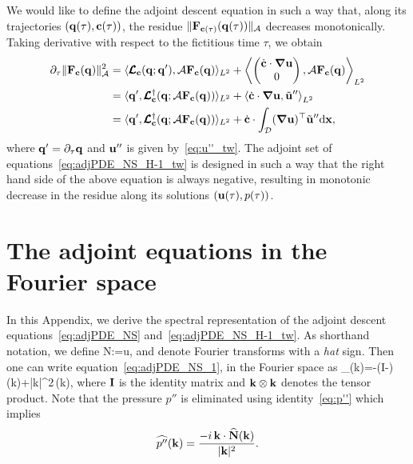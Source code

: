 \documentclass{jfm}
\begin{document}
We would like to define the adjoint descent equation in such a way that, along its trajectories
$(\mathbf q(\tau),\mathbf c(\tau))$, the residue $\|\mathbf F_{\mathbf c(\tau)}(\mathbf q(\tau))\|_{\mathcal A}$
decreases monotonically. Taking derivative with respect to the fictitious time $\tau$, we obtain
\begin{align}
\partial_\tau\|\mathbf F_{\mathbf c}(\mathbf q)\|^2_{\mathcal A}&=
\langle\pmb{\mathcal L}_{\mathbf c}(\mathbf q;\mathbf q'),\mathcal A\mathbf F_{\mathbf c}(\mathbf q)\rangle_{L^2}+
\left\langle
\begin{pmatrix}
\dot{\mathbf c}\cdot\mbox{\boldmath $\nabla$}\mathbf u\\
0
\end{pmatrix},
\mathcal A\mathbf F_{\mathbf c}(\mathbf q)
\right\rangle_{L^2}\nonumber\\
&=\langle\mathbf q',\pmb{\mathcal L}_{\mathbf c}^\dagger(\mathbf q;\mathcal A\mathbf F_{\mathbf c}(\mathbf q))\rangle_{L^2}+
\left\langle
\dot{\mathbf c}\cdot\mbox{\boldmath $\nabla$}\mathbf u,
\tilde{\mathbf u}''
\right\rangle_{L^2}\nonumber\\
&=\langle\mathbf q',\pmb{\mathcal L}_{\mathbf c}^\dagger(\mathbf q;\mathcal A\mathbf F_{\mathbf c}(\mathbf q))\rangle_{L^2}+
\dot{\mathbf c}\cdot\int_{\mathcal D}(\mbox{\boldmath $\nabla$}\mathbf u)^\top
\tilde{\mathbf u}''\mathrm d\mathbf x,
\end{align}
where $\mathbf q'=\partial_\tau \mathbf q$ and $\mathbf u''$ is given by~\eqref{eq:u''_tw}. The adjoint set
of equations~\eqref{eq:adjPDE_NS_H-1_tw} is designed in such a way that the
right hand side of the above equation is always negative, resulting in
monotonic decrease in the residue along its solutions $(\mathbf u(\tau),p(\tau))$.

\section{The adjoint equations in the Fourier space}\label{app:adj_fs}
In this Appendix, we derive the spectral representation of the adjoint descent
equations~\eqref{eq:adjPDE_NS} and~\eqref{eq:adjPDE_NS_H-1_tw}. As shorthand notation,
we define
\beq
\vc N:=\vc u,
\eeq
and denote Fourier transforms with a \emph{hat} sign. Then one can write
equation~\eqref{eq:adjPDE_NS_1}, in the Fourier space as
\beq
\partial_\tau{}(\vc k)=-\left(\vc I-\right)
(\vc k)+\nu |\vc k|^2\,(\vc k),
\label{eq:adjPDE_fs}
\eeq
where $\mathbf I$ is the identity matrix and $\mathbf k\otimes\mathbf k$ denotes the tensor product.
Note that the pressure $p''$ is eliminated using
identity~\eqref{eq:p''} which implies
$$\widehat{p''}(\mathbf k)=\frac{-i\,\mathbf k\cdot \widehat{\mathbf N}(\mathbf k)}{|\mathbf k|^2}.$$
\end{document}
